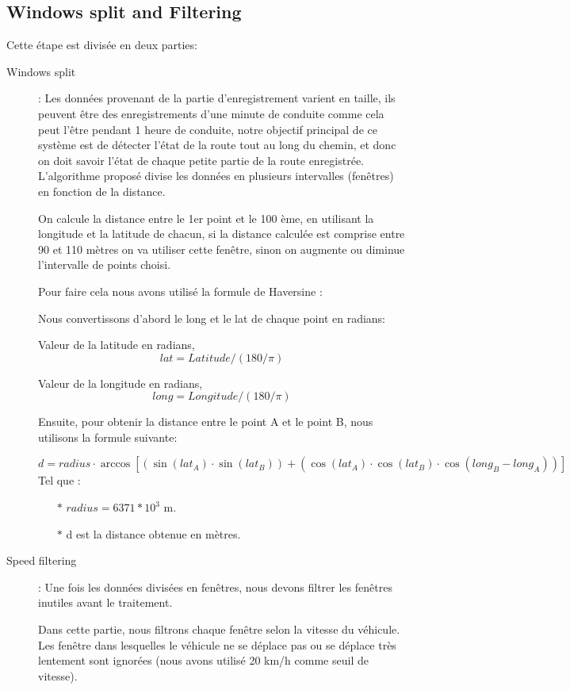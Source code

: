 \subsection{Windows split and Filtering}
Cette étape est divisée en deux parties:
\begin{description}
  \item[Windows split]:  Les données provenant de la partie d’enregistrement varient en taille, ils peuvent être des enregistrements d’une minute de conduite comme cela peut l’être pendant 1 heure de conduite, notre objectif principal de ce système est de détecter l’état de la route tout au long du chemin, et donc on doit savoir l'état de chaque petite partie de la route enregistrée. L’algorithme proposé divise les données en plusieurs intervalles (fenêtres) en fonction de la distance.
  
  On calcule la distance entre le 1er point et le 100 ème, en utilisant la longitude et la latitude de chacun, si la distance calculée est comprise entre 90 et 110 mètres on va utiliser cette fenêtre, sinon on augmente ou diminue l'intervalle de points choisi.

  Pour faire cela nous avons utilisé la formule de Haversine \cite{HaversineFormula2020}:

  Nous convertissons d'abord le long et le lat de chaque point en radians:

  Valeur de la latitude en radians, \[lat = Latitude / (180/\pi)\]

  Valeur de la longitude en radians, \[long = Longitude / (180/\pi)\] 


  Ensuite, pour obtenir la distance entre le point A et le point B, nous utilisons la formule suivante:

   \[
    d = radius   \cdot \arccos
    \left[
        \left(
            \sin(lat_{A}) \cdot \sin(lat_{B})
        \right)
        + 
        \left(
            \cos(lat_{A}) \cdot \cos(lat_{B}) \cdot \cos(long_{B} - long_{A})
        \right)
        \right]
\]
Tel que : 
\begin{itemize}
  \item[$\ast$] $radius  = 6371 * 10^{3} $ m.
  \item[$\ast$] d est la distance obtenue en mètres.
\end{itemize}
 
\item[Speed filtering]: Une fois les données divisées en fenêtres, nous devons filtrer les fenêtres inutiles avant le traitement. 

Dans cette partie, nous filtrons chaque fenêtre  selon la vitesse du véhicule. Les fenêtre dans lesquelles le véhicule ne se déplace pas ou se déplace très lentement sont ignorées (nous avons utilisé 20 km/h comme seuil de vitesse).

\end{description}


